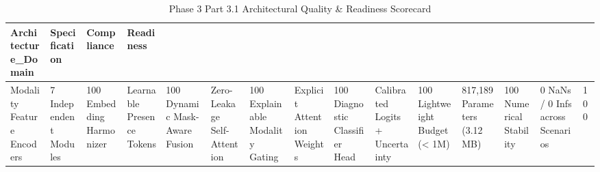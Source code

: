 \begin{table}
\caption{Phase 3 Part 3.1 Architectural Quality & Readiness Scorecard}
\begin{tabular}{llll}
\toprule
Architecture_Domain & Specification & Compliance & Readiness \\
\midrule
Modality Feature Encoders & 7 Independent Modules & 100%
Embedding Harmonizer & Learnable Presence Tokens & 100%
Dynamic Mask-Aware Fusion & Zero-Leakage Self-Attention & 100%
Explainable Modality Gating & Explicit Attention Weights & 100%
Diagnostic Classifier Head & Calibrated Logits + Uncertainty & 100%
Lightweight Budget (< 1M) & 817,189 Parameters (3.12 MB) & 100%
Numerical Stability & 0 NaNs / 0 Infs across Scenarios & 100%
\bottomrule
\end{tabular}
\end{table}
